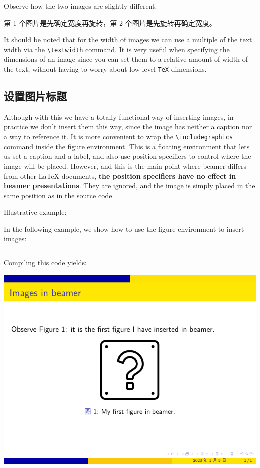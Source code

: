 Observe how the two images are slightly different.

第 1 个图片是先确定宽度再旋转，第 2 个图片是先旋转再确定宽度。

It should be noted that for the width of images we can use a multiple of the text width via the \verb|\textwidth| command. It is very useful when specifying the dimensions of an image since you can set them to a relative amount of width of the text, without having to worry about low-level \verb|TeX| dimensions.

\subsection{设置图片标题}

Although with this we have a totally functional way of inserting images, in practice we don’t insert them this way, since the image has neither a caption nor a way to reference it. It is more convenient to wrap the \verb|\includegraphics| command inside the figure environment. This is a floating environment that lets us set a caption and a label, and also use position specifiers to control where the image will be placed. However, and this is the main point where beamer differs from other {\LaTeX} documents, \textbf{the position specifiers have no effect in beamer presentations}. They are ignored, and the image is simply placed in the same position as in the source code.

Illustrative example:

In the following example, we show how to use the figure environment to insert images:

\inputminted[linenos=true]{latex}{examples/beamer/figure-caption1.tex}

Compiling this code yields:

\includegraphics{examples/beamer/figure-caption1.pdf}

